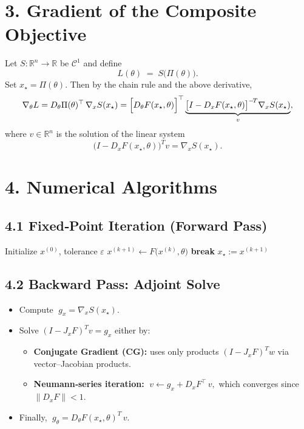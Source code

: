 \documentclass{article}
\begin{document}
\section*{3. Gradient of the Composite Objective}
Let \(S\colon\mathbb{R}^n\to\mathbb{R}\) be \(\mathcal C^1\) and define
\[
  L(\theta) \;=\; S\bigl(\Pi(\theta)\bigr).
\]
Set \(x_\star = \Pi(\theta)\).  Then by the chain rule and the above derivative,
\[
  \nabla_\theta L
  = D_\theta \Pi(\theta)^\top\,\nabla_x S(x_\star)
  = \Bigl[D_\theta F(x_\star,\theta)\Bigr]^\top
    \underbrace{\bigl[I - D_xF(x_\star,\theta)\bigr]^{-\!T}
                   \nabla_x S(x_\star)}_{v},
\]
where \(v\in\mathbb{R}^n\) is the solution of the linear system
\[
  \bigl(I - D_xF(x_\star,\theta)\bigr)^{T}v
  = \nabla_x S(x_\star).
\]

\section*{4. Numerical Algorithms}
\subsection*{4.1 Fixed‐Point Iteration (Forward Pass)}
\begin{algorithm}[H]
\caption{Compute \(x_\star=\Pi(\theta)\) by simple iteration}
\begin{algorithmic}[1]
  \STATE Initialize \(x^{(0)}\), tolerance \(\varepsilon\)
    \STATE \(x^{(k+1)} \leftarrow F\bigl(x^{(k)},\theta\bigr)\)
      \STATE \textbf{break}
    \ENDIF
  \ENDFOR
  \RETURN \(x_\star := x^{(k+1)}\)
\end{algorithmic}
\end{algorithm}

\subsection*{4.2 Backward Pass: Adjoint Solve}
\begin{itemize}
  \item Compute \(\;g_x = \nabla_x S(x_\star)\).
  \item Solve \((I - J_xF)^{T}v = g_x\) either by:
    \begin{itemize}
      \item \textbf{Conjugate Gradient (CG):} uses only products
        \((I - J_xF)^{T}w\) via vector–Jacobian products.
      \item \textbf{Neumann‐series iteration:}
        \(\;v\leftarrow g_x + D_xF^\top\,v,\) which converges since \(\|D_xF\|<1\).
    \end{itemize}
  \item Finally, \(\;g_\theta = D_\theta F(x_\star,\theta)^{T}\,v\).
\end{itemize}
\end{document}
